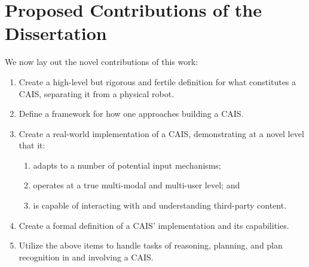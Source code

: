 \section{Proposed Contributions of the Dissertation}

We now lay out the novel contributions of this work:

\begin{enumerate}
\item Create a high-level but rigorous and fertile definition for what
  constitutes a CAIS, separating it from a physical robot.
\item Define a framework for how one approaches building a CAIS.
\item Create a real-world implementation of a CAIS, demonstrating at a
  novel level that it:
        \begin{enumerate}
            \item adapts to a number of potential input mechanisms;
            \item operates at a true multi-modal and multi-user level; and
            \item is capable of interacting with and understanding
              third-party content.
        \end{enumerate}
      \item Create a formal definition of a CAIS' implementation and
        its capabilities.
      \item Utilize the above items to handle tasks of reasoning,
        planning, and plan recognition in and involving a CAIS.
\end{enumerate}